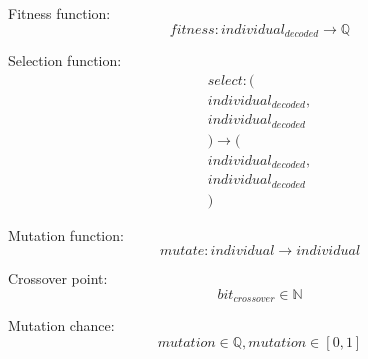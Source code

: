 \documentclass[conference]{IEEEtran}
\begin{document}
Fitness function:
\begin{equation} fitness : individual_{decoded} \rightarrow \mathbb{Q} \end{equation}

Selection function:
\begin{multline} select : (\\individual_{decoded}, \\individual_{decoded}\\) \rightarrow (\\individual_{decoded}, \\individual_{decoded}\\) \end{multline}

Mutation function:
\begin{equation} mutate : individual \rightarrow individual \end{equation}

Crossover point:
\begin{equation} bit_{crossover} \in \mathbb{N} \end{equation}

Mutation chance:
\begin{equation} mutation \in \mathbb{Q}, mutation \in [0, 1] \end{equation}
\end{document}
